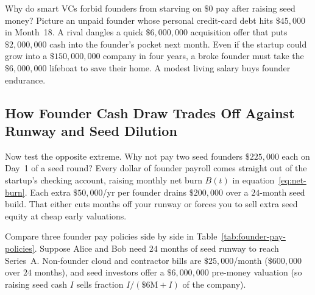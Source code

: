 \begin{happeningbox}
Why do smart VCs forbid founders from starving on $\$0$ pay after raising seed money? Picture an unpaid founder whose personal credit-card debt hits $\$45{,}000$ in Month~18. A rival dangles a quick $\$6{,}000{,}000$ acquisition offer that puts $\$2{,}000{,}000$ cash into the founder's pocket next month. Even if the startup could grow into a $\$150{,}000{,}000$ company in four years, a broke founder must take the $\$6{,}000{,}000$ lifeboat to save their home. A modest living salary buys founder endurance.
\end{happeningbox}

\subsection{How Founder Cash Draw Trades Off Against Runway and Seed Dilution}
\label{subsec:risk-adjusted-salary-equity}

Now test the opposite extreme. Why not pay two seed founders $\$225{,}000$ each on Day~1 of a seed round? Every dollar of founder payroll comes straight out of the startup's checking account, raising monthly net burn $B(t)$ in equation~\eqref{eq:net-burn}. Each extra $\$50{,}000$/yr per founder drains $\$200{,}000$ over a $24$-month seed build. That either cuts months off your runway or forces you to sell extra seed equity at cheap early valuations.

Compare three founder pay policies side by side in Table~\ref{tab:founder-pay-policies}. Suppose Alice and Bob need $24$ months of seed runway to reach Series~A. Non-founder cloud and contractor bills are $\$25{,}000$/month ($\$600{,}000$ over $24$ months), and seed investors offer a $\$6{,}000{,}000$ pre-money valuation (so raising seed cash $I$ sells fraction $I / (\$6\text{M} + I)$ of the company).

